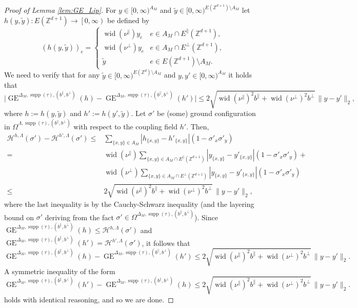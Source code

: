 \documentclass[11pt, reqno]{amsart}
\newcommand{\Z}{\mathbb{Z}}
\DeclareMathOperator{\supp}{supp}
\DeclareMathOperator{\GE}{GE}
\DeclareMathOperator{\wid}{wid}
\numberwithin{equation}{section}
\begin{document}
\begin{proof}[Proof of Lemma \ref{lem:GE_Lip}]
For $y\in [0,\infty)^{A_M}$ and
$\tilde{y} \in [0,\infty)^{E(\Z^{d+1})\setminus A_M}$ 
let $h(y,\tilde{y}): E(\Z^{d+1}) \rightarrow \left[0, \infty \right)$ be defined by
\begin{equation*}
\left(h(y,\tilde{y})\right)_{e}=\begin{cases}
\wid(\nu^{\parallel}) y_e & e\in A_M\cap E^{\parallel}(\Z^{d+1}), \\
\wid(\nu^{\perp}) y_e & e\in A_M\cap E^{\perp}(\Z^{d+1}),\\
\tilde{y} & e\in E({\mathbb Z}^{d+1})\setminus A_M.
\end{cases}
\end{equation*}        
We need to verify that for any $\tilde{y} \in [0,\infty)^{E(\Z^{d}) \setminus A_M}$ and $y,y'\in [0,\infty)^{A_M}$ it holds that 
\begin{equation*}
\lvert \GE^{\Delta_M,\supp(\tau),(b^{\parallel},b^{\perp})} (h)-\GE^{\Delta_M,\supp(\tau),(b^{\parallel},b^{\perp})} (h')\rvert    
\leq 2\sqrt{\wid (\nu^{\parallel})^{2}  b^{\parallel}+\wid (\nu^{\perp})^{2} b^{\perp}}\,\lVert y-y' \rVert_2,
\end{equation*}
where $h:=h(y,\tilde{y})$ and $h':=h(y',\tilde{y})$.
Let $\sigma'$ be (some) ground configuration in $\Omega^{\Lambda, \supp(\tau),(b^{\parallel},b^{\perp})}$
with respect to the coupling field $h'$. 
Then, 
\begin{align*}   
\mathcal{H}^{h,\Lambda} (\sigma')-\mathcal{H}^{h',\Lambda} (\sigma') \leq &
\sum_{\{x,y\}\in A_M} |h_{\{x,y\}}-h'_{\{x,y\}}| \left(1- \sigma'_x \sigma'_y  \right)\\
=&\wid(\nu^{\parallel}) \sum_{\{x,y\}\in A_M\cap E^{\parallel}(\Z^{d+1})}  |y_{\{x,y\}}-y'_{\{x,y\}}| \left(1- \sigma'_x \sigma'_y  \right)+\\
&\wid(\nu^{\perp}) \sum_{\{x,y\}\in A_M\cap E^{\perp}(\Z^{d+1})}  |y_{\{x,y\}}-y'_{\{x,y\}}| \left(1- \sigma'_x \sigma'_y  \right)\\
\leq &2\sqrt{\wid (\nu^{\parallel})^{2}  b^{\parallel}+\wid (\nu^{\perp})^{2} b^{\perp}}\,\lVert y- y' \rVert_{2},
\end{align*}
where the last inequality is by the Cauchy-Schwarz inequality (and the layering bound on $\sigma'$ deriving from the fact $\sigma' \in \Omega^{\Delta_M,\supp(\tau),(b^{\parallel},b^{\perp})}$).
Since $\GE^{\Delta_M,\supp(\tau),(b^{\parallel},b^{\perp})}(h)\leq\mathcal{H}^{h,\Lambda} (\sigma')$ and $\GE^{\Delta_M,\supp(\tau),(b^{\parallel},b^{\perp})}(h')=\mathcal{H}^{h',\Lambda} (\sigma')$, it follows that  
$$
\GE^{\Delta_M,\supp(\tau),(b^{\parallel},b^{\perp})}(h)-\GE^{\Delta_M,\supp(\tau),(b^{\parallel},b^{\perp})}(h') \leq 
2\sqrt{\wid (\nu^{\parallel})^{2}  b^{\parallel}+\wid (\nu^{\perp})^{2} b^{\perp}}\,\lVert y- y'\rVert_{2}.
$$
A symmetric inequality of the form
$$
\GE^{\Delta_M,\supp(\tau),(b^{\parallel},b^{\perp})}(h')-\GE^{\Delta_M,\supp(\tau),(b^{\parallel},b^{\perp})}(h) \leq 
2\sqrt{\wid (\nu^{\parallel})^{2}  b^{\parallel}+\wid (\nu^{\perp})^{2} b^{\perp}}\,\lVert y- y'\rVert_{2}.
$$
holds with identical reasoning, and so we are done.
\end{proof}
\end{document}
